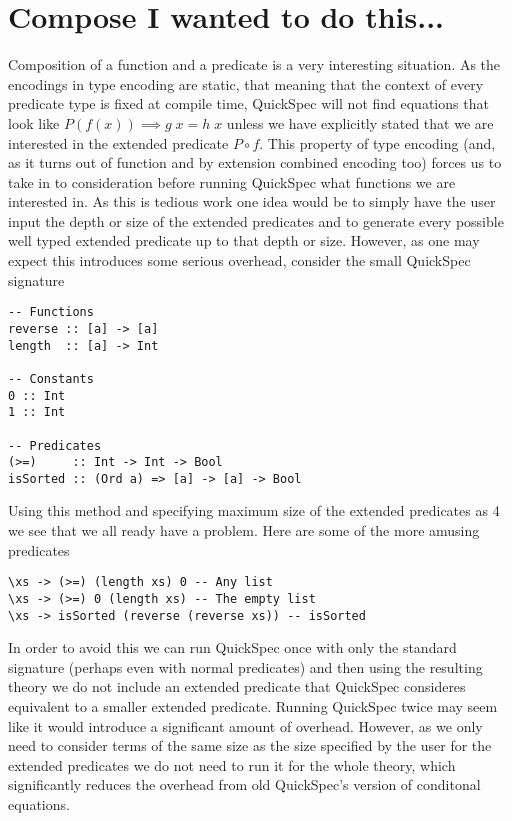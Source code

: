 \section{Compose I wanted to do this...}
Composition of a function and a predicate
is a very interesting situation. As the
encodings in type encoding are static, that meaning
that the context of every predicate type is fixed
at compile time, QuickSpec will not find equations
that look like $P(f(x))\implies g\;x=h\;x$
unless we have explicitly stated that we are interested
in the extended predicate $P \circ f$. This property of type encoding
(and, as it turns out of function and by extension combined encoding too)
forces us to take in to consideration before running QuickSpec
what functions we are interested in. %
As this is tedious work one idea would be to simply have the user input the depth or size
of the extended predicates and to generate every possible well typed
extended predicate up to that depth or size. However, as one may expect
this introduces some serious overhead, consider the small QuickSpec signature
\begin{verbatim}
-- Functions
reverse :: [a] -> [a]
length  :: [a] -> Int

-- Constants
0 :: Int
1 :: Int

-- Predicates
(>=)     :: Int -> Int -> Bool 
isSorted :: (Ord a) => [a] -> [a] -> Bool
\end{verbatim}
Using this method and specifying maximum size of the extended predicates as 4
we see that we all ready have a problem. Here are some of the more amusing predicates
\begin{verbatim}
\xs -> (>=) (length xs) 0 -- Any list
\xs -> (>=) 0 (length xs) -- The empty list
\xs -> isSorted (reverse (reverse xs)) -- isSorted
\end{verbatim}
In order to avoid this we can run QuickSpec once with only the standard signature (perhaps even with
normal predicates) and then using the resulting theory we do not include an extended predicate
that QuickSpec consideres equivalent to a smaller extended predicate.
Running QuickSpec twice may seem like it would introduce a significant amount of overhead. However,
as we only need to consider terms of the same size as the size specified by the user for the
extended predicates we do not need to run it for the whole theory, which significantly reduces the overhead
from old QuickSpec's version of conditonal equations.
